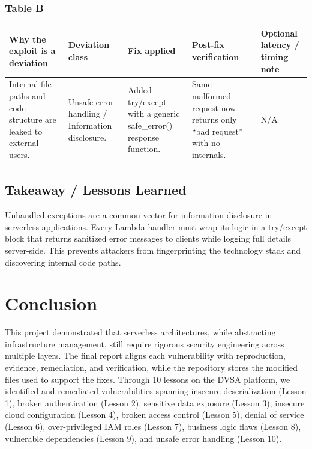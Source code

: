 \documentclass[12pt]{report}
\begin{document}
\subsection*{Table B}
\begin{table}[H]
  \footnotesize
  \centering
  \begin{tabularx}{\textwidth}{|Y|Y|Y|Y|Y|}
    \hline
    \textbf{Why the exploit is a deviation} & \textbf{Deviation class} & \textbf{Fix applied} & \textbf{Post-fix verification} & \textbf{Optional latency / timing note} \\
    \hline
    Internal file paths and code structure are leaked to external users. &
    Unsafe error handling / Information disclosure. &
    Added try/except with a generic safe\_error() response function. &
    Same malformed request now returns only ``bad request'' with no internals. &
    N/A \\
    \hline
  \end{tabularx}
\end{table}

\section{Takeaway / Lessons Learned}
Unhandled exceptions are a common vector for information disclosure in serverless applications. Every Lambda handler must wrap its logic in a try/except block that returns sanitized error messages to clients while logging full details server-side. This prevents attackers from fingerprinting the technology stack and discovering internal code paths.

\clearpage


\chapter*{Conclusion}

This project demonstrated that serverless architectures, while abstracting infrastructure management, still require rigorous security engineering across multiple layers. The final report aligns each vulnerability with reproduction, evidence, remediation, and verification, while the repository stores the modified files used to support the fixes. Through 10 lessons on the DVSA platform, we identified and remediated vulnerabilities spanning insecure deserialization (Lesson 1), broken authentication (Lesson 2), sensitive data exposure (Lesson 3), insecure cloud configuration (Lesson 4), broken access control (Lesson 5), denial of service (Lesson 6), over-privileged IAM roles (Lesson 7), business logic flaws (Lesson 8), vulnerable dependencies (Lesson 9), and unsafe error handling (Lesson 10).
\end{document}

